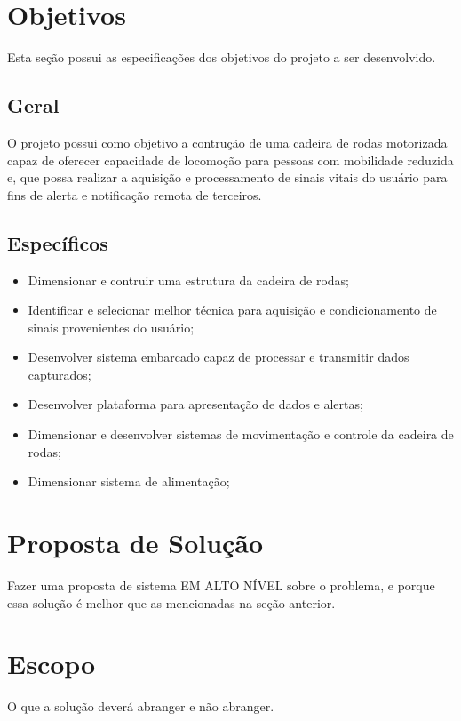 \section{Objetivos}
Esta seção possui as especificações dos objetivos do projeto a ser desenvolvido.

\subsection{Geral}
O projeto possui como objetivo a contrução de uma cadeira de rodas motorizada capaz de
oferecer capacidade de locomoção para pessoas com mobilidade reduzida
e, que possa realizar
a aquisição e processamento de sinais vitais do usuário para fins de alerta e notificação
remota de terceiros.

\subsection{Específicos}

\begin{itemize}
\item Dimensionar e contruir uma estrutura da cadeira de rodas;
\item Identificar e selecionar melhor técnica para aquisição e condicionamento de sinais provenientes do usuário;
\item Desenvolver sistema embarcado capaz de processar e transmitir dados capturados;
\item Desenvolver plataforma para apresentação de dados e alertas;
\item Dimensionar e desenvolver sistemas de movimentação e controle da cadeira de rodas;
\item Dimensionar sistema de alimentação;
\end{itemize}

\section{Proposta de Solução}

Fazer uma proposta de sistema EM ALTO NÍVEL sobre o problema, e porque essa solução é melhor que as mencionadas na seção anterior.

\section{Escopo}

O que a solução deverá abranger e não abranger.
